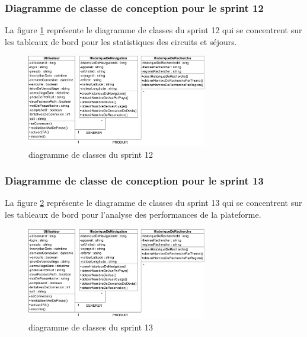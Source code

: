 \documentclass[12pt]{report}
\begin{document}
			\subsubsection{Diagramme de classe de conception pour le sprint 12}
				
			\hspace{15pt} La figure \ref{fig:sprint12} représente le diagramme de classes du sprint 12 qui se concentrent sur les tableaux de bord pour les statistiques des circuits et séjours.


			\begin{figure}[h]
				\centering
				\includegraphics[width=0.7\textwidth]{sprint12.jpg}
				\caption{diagramme de classes du sprint 12}
				\label{fig:sprint12}
			\end{figure}
			\FloatBarrier

			\subsubsection{Diagramme de classe de conception pour le sprint 13}
				
			\hspace{15pt} La figure \ref{fig:sprint13} représente le diagramme de classes du sprint 13 qui se concentrent sur les tableaux de bord pour l'analyse des performances de la plateforme.


			\begin{figure}[h]
				\centering
				\includegraphics[width=0.7\textwidth]{sprint13.jpg}
				\caption{diagramme de classes du sprint 13}
				\label{fig:sprint13}
			\end{figure}
			\FloatBarrier
\end{document}
